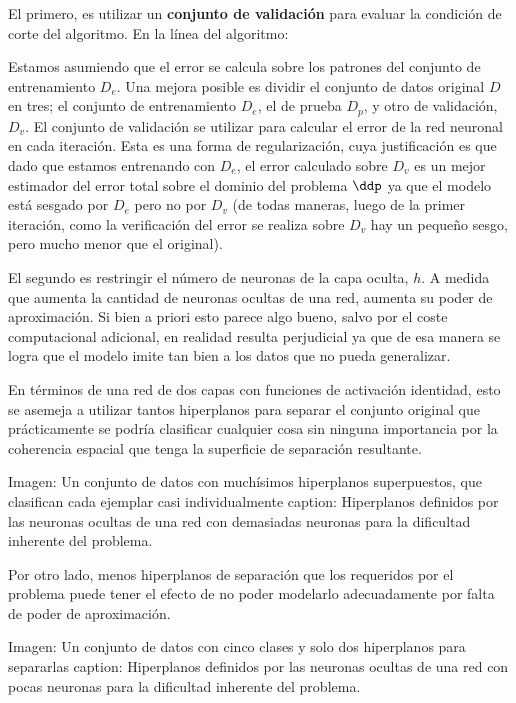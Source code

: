 El primero, es utilizar un \textbf{conjunto de validación} para evaluar la condición de corte del algoritmo. En la línea del algoritmo:


Estamos asumiendo que el error se calcula sobre los patrones del conjunto de entrenamiento $D_e$. Una mejora posible es dividir el conjunto de datos original $D$ en tres; el conjunto de entrenamiento $D_e$, el de prueba $D_p$, y otro de validación, $D_v$. El conjunto de validación se utilizar para calcular el error de la red neuronal en cada iteración. Esta es una forma de regularización, cuya justificación es que dado que estamos entrenando con $D_e$, el error calculado sobre $D_v$ es un mejor estimador del error total sobre el dominio del problema $\ddp$ ya que el modelo está sesgado por $D_e$ pero no por $D_v$ (de todas maneras, luego de la primer iteración, como la verificación del error se realiza sobre $D_v$ hay un pequeño sesgo, pero mucho menor que el original).

El segundo es restringir el número de neuronas de la capa oculta, $h$. A medida que aumenta la cantidad de neuronas ocultas de una red, aumenta su poder de aproximación. Si bien a priori esto parece algo bueno, salvo por el coste computacional adicional, en realidad resulta perjudicial ya que de esa manera se logra que el modelo imite tan bien a los datos que no pueda generalizar.

En términos de una red de dos capas con funciones de activación identidad, esto se asemeja a utilizar tantos hiperplanos para separar el conjunto original que prácticamente se podría clasificar cualquier cosa sin ninguna importancia por la coherencia espacial que tenga la superficie de separación resultante.

Imagen: Un conjunto de datos con muchísimos hiperplanos superpuestos, que clasifican cada ejemplar casi individualmente
caption: Hiperplanos definidos por las neuronas ocultas de una red con demasiadas neuronas para la dificultad inherente del problema. 

Por otro lado, menos hiperplanos de separación que los requeridos por el problema puede tener el efecto de no poder modelarlo adecuadamente por falta de poder de aproximación.

Imagen: Un conjunto de datos con cinco clases y solo dos hiperplanos para separarlas
caption: Hiperplanos definidos por las neuronas ocultas de una red con pocas neuronas para la dificultad inherente del problema. 

